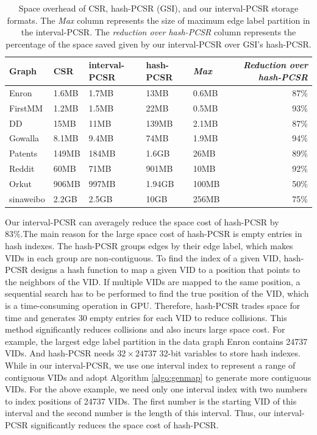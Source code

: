 \begin{table}
\centering
  \caption{Space overhead of CSR, hash-PCSR (GSI), and our interval-PCSR storage formats. The \emph{Max} column represents the size of maximum edge label partition in
  the interval-PCSR. The \emph{reduction over hash-PCSR} column represents the percentage of the space saved given by our interval-PCSR over GSI's hash-PCSR.}
  \label{tab:graphsize}
  \scriptsize
  \begin{tabular}{lllllr}
  \toprule
    \textbf{Graph} &\textbf{CSR}&\textbf{interval-PCSR}&\textbf{hash-PCSR}&\emph{\textbf{Max}}&\emph{Reduction over hash-PCSR}\\
    \midrule
    Enron 		&1.6MB	&1.7MB	&13MB	&0.6MB	&87\% \\
    FirstMM 	&1.2MB	&1.5MB	&22MB	&0.5MB	&93\% \\
    DD 			&15MB	&11MB	&139MB	&2.1MB	&87\% \\
    Gowalla 	&8.1MB	&9.4MB	&74MB	&1.9MB	&94\% \\
    Patents 	&149MB	&184MB	&1.6GB	&26MB	&89\% \\
    Reddit 		&60MB	&71MB	&901MB	&10MB	&92\% \\
    Orkut 		&906MB	&997MB	&1.94GB	&100MB	&50\% \\
    sinaweibo	&2.2GB	&2.5GB	&10GB	&256MB	&75\% \\

    \bottomrule
  \end{tabular}
\end{table}

Our interval-PCSR can averagely reduce the space cost of hash-PCSR by 83\%.The main reason for the large space cost of hash-PCSR is empty
entries in hash indexes. The hash-PCSR groups edges by their edge label, which makes VIDs in each group are non-contiguous. To find the
index of a given VID, hash-PCSR designs a hash function to map a given VID to a position that points to the neighbors of the VID. If
multiple VIDs are mapped to the same position, a sequential search has to be performed to find the true position of the VID, which is a
time-consuming operation in GPU. Therefore, hash-PCSR trades space for time and generates 30 empty entries for each VID to reduce
collisions. This method significantly reduces collisions and also incurs large space cost. For example, the largest edge label partition in
the data graph Enron contains 24737 VIDs. And hash-PCSR needs $32 \times 24737$ 32-bit variables to store hash indexes. While in our
interval-PCSR, we use one interval index to represent a range of contiguous VIDs and adopt Algorithm \ref{algo:genmap} to generate more
contiguous VIDs. For the above example, we need only one interval index with two numbers to index positions of 24737 VIDs. The first number
is the starting VID of this interval and the second number is the length of this interval. Thus, our interval-PCSR significantly reduces
the space cost of hash-PCSR.

